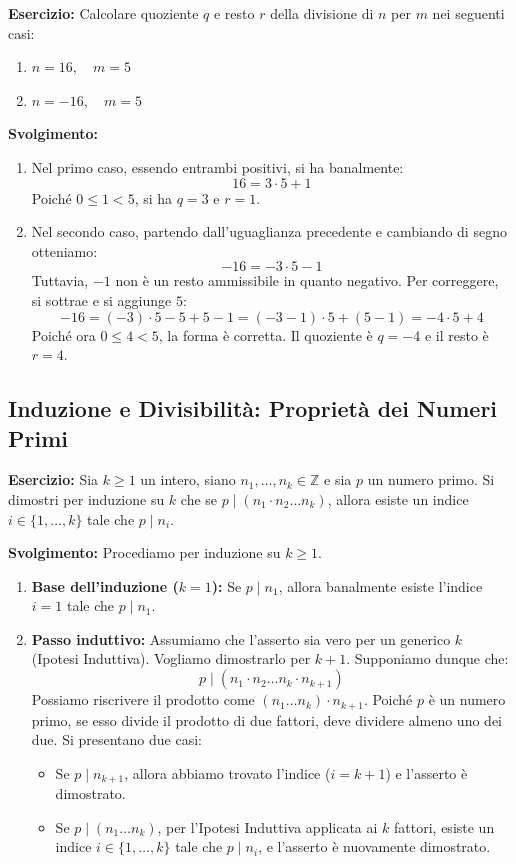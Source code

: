 \documentclass[12pt, a4paper]{article}
\begin{document}
\textbf{Esercizio:} Calcolare quoziente $q$ e resto $r$ della divisione di $n$ per $m$ nei seguenti casi:
\begin{enumerate}
    \item $n = 16, \quad m = 5$
    \item $n = -16, \quad m = 5$
\end{enumerate}

\textbf{Svolgimento:}
\begin{enumerate}
    \item Nel primo caso, essendo entrambi positivi, si ha banalmente:
    \[ 16 = 3 \cdot 5 + 1 \]
    Poiché $0 \le 1 < 5$, si ha $q = 3$ e $r = 1$.
    
    \item Nel secondo caso, partendo dall'uguaglianza precedente e cambiando di segno otteniamo:
    \[ -16 = -3 \cdot 5 - 1 \]
    Tuttavia, $-1$ non è un resto ammissibile in quanto negativo. Per correggere, si sottrae e si aggiunge $5$:
    \[ -16 = (-3) \cdot 5 - 5 + 5 - 1 = (-3 - 1) \cdot 5 + (5 - 1) = -4 \cdot 5 + 4 \]
    Poiché ora $0 \le 4 < 5$, la forma è corretta. Il quoziente è $q = -4$ e il resto è $r = 4$.
\end{enumerate}

\subsection{Induzione e Divisibilità: Proprietà dei Numeri Primi}
\textbf{Esercizio:} Sia $k \ge 1$ un intero, siano $n_1, \dots, n_k \in \mathbb{Z}$ e sia $p$ un numero primo. Si dimostri per induzione su $k$ che se $p \mid (n_1 \cdot n_2 \dots n_k)$, allora esiste un indice $i \in \{1, \dots, k\}$ tale che $p \mid n_i$.

\textbf{Svolgimento:} Procediamo per induzione su $k \ge 1$.
\begin{enumerate}
    \item \textbf{Base dell'induzione ($k=1$):} Se $p \mid n_1$, allora banalmente esiste l'indice $i=1$ tale che $p \mid n_1$.
    \item \textbf{Passo induttivo:} Assumiamo che l'asserto sia vero per un generico $k$ (Ipotesi Induttiva). Vogliamo dimostrarlo per $k+1$. Supponiamo dunque che:
    \[ p \mid (n_1 \cdot n_2 \dots n_k \cdot n_{k+1}) \]
    Possiamo riscrivere il prodotto come $(n_1 \dots n_k) \cdot n_{k+1}$. Poiché $p$ è un numero primo, se esso divide il prodotto di due fattori, deve dividere almeno uno dei due. Si presentano due casi:
    \begin{itemize}
        \item Se $p \mid n_{k+1}$, allora abbiamo trovato l'indice ($i = k+1$) e l'asserto è dimostrato.
        \item Se $p \mid (n_1 \dots n_k)$, per l'Ipotesi Induttiva applicata ai $k$ fattori, esiste un indice $i \in \{1, \dots, k\}$ tale che $p \mid n_i$, e l'asserto è nuovamente dimostrato.
    \end{itemize}
\end{enumerate}
\end{document}
